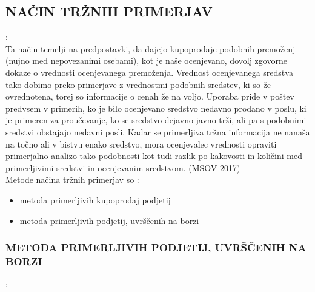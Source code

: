 \documentclass[12pt,a4paper]{amsart}
\theoremstyle{definition} %
\theoremstyle{plain} %
\begin{document}
\subsection{NAČIN TRŽNIH PRIMERJAV}:\\

Ta način temelji na predpostavki, da dajejo kupoprodaje podobnih premoženj (nujno med nepovezanimi osebami), kot je naše ocenjevano, dovolj zgovorne dokaze o vrednosti ocenjevanega premoženja. 
Vrednost ocenjevanega sredstva tako dobimo preko primerjave z vrednostmi podobnih sredstev, ki so že ovrednotena, torej so informacije o cenah že na voljo. Uporaba pride v poštev predvsem v primerih, ko je bilo ocenjevano sredstvo nedavno prodano v poslu, ki je primeren za proučevanje, ko se sredstvo dejavno javno trži, ali pa s podobnimi sredstvi obstajajo nedavni posli. Kadar se primerljiva tržna informacija ne nanaša na točno ali v bistvu enako sredstvo, mora ocenjevalec vrednosti opraviti primerjalno analizo tako podobnosti kot tudi razlik po kakovosti in količini med primerljivimi sredstvi in ocenjevanim sredstvom. (MSOV 2017) \\

Metode načina tržnih primerjav so :
\begin{itemize}
\item metoda primerljivih kupoprodaj podjetij
\item metoda primerljivih podjetij, uvrščenih na borzi
\end{itemize}

\subsubsection{METODA PRIMERLJIVIH PODJETIJ, UVRŠČENIH NA BORZI}:\\
\end{document}
